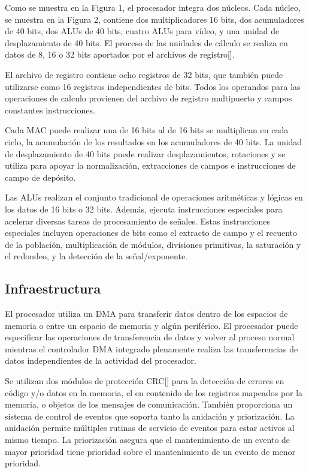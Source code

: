 Como se muestra en la Figura 1, el procesador integra dos núcleos. Cada núcleo, se muestra en la Figura 2, contiene dos multiplicadores 16 bits, dos acumuladores de 40 bits, dos ALUs  de 40 bits, cuatro ALUs para vídeo, y una unidad de desplazamiento de 40 bits. El proceso de las unidades de cálculo se realiza en datos de 8, 16 o 32 bits aportados por el archivos de registro[].

El archivo de registro contiene ocho registros de 32 bits, que también puede utilizarse como 16 registros independientes de bits. Todos los operandos para las operaciones de calculo provienen del archivo de registro multipuerto y campos constantes instrucciones.

Cada MAC puede realizar una de 16 bits al de 16 bits se multiplican en cada ciclo, la acumulación de los resultados en los acumuladores de 40 bits. La unidad de desplazamiento de 40 bits puede realizar desplazamientos, rotaciones y se utiliza para apoyar la normalización, extracciones de campos e instrucciones de campo de depósito.

Las ALUs realizan el conjunto tradicional de operaciones aritméticas y lógicas en los datos de 16 bits o 32 bits. Además, ejecuta instrucciones especiales para acelerar diversas tareas de procesamiento de señales. Estas instrucciones especiales incluyen operaciones de bits como el extracto de campo y el recuento de la población, multiplicación de módulos, divisiones primitivas, la saturación y el redondeo, y la detección de la señal/exponente.

\subsection{Infraestructura}

El procesador utiliza un DMA para transferir datos dentro de los espacios de memoria o entre un espacio de memoria y algún periférico. El procesador puede especificar las operaciones de transferencia de datos y volver al proceso normal mientras el controlador DMA integrado plenamente realiza las transferencias de datos independientes de la actividad del procesador. 

Se utilizan dos módulos de protección CRC[] para la detección de errores en código y/o datos en la memoria, el en contenido de los registros mapeados por la memoria, o objetos de los mensajes de comunicación. También proporciona un sistema de control de eventos que soporta tanto la anidación y priorización. La anidación permite múltiples rutinas de servicio de eventos para estar activos al mismo tiempo. La priorización asegura que el mantenimiento de un evento de mayor prioridad tiene prioridad sobre el mantenimiento de un evento de menor prioridad. 

